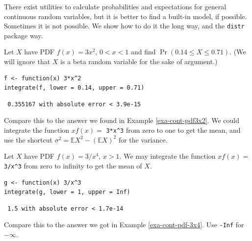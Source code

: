 \documentclass[captions=tableheading]{scrbook}
\begin{document}
There exist utilities to calculate probabilities and expectations for general continuous random variables, but it is better to find a built-in model, if possible. Sometimes it is not possible. We show how to do it the long way, and the \texttt{distr} package way.

\begin{example}
Let \(X\) have PDF \(f(x)=3x^{2}\), \(0<x<1\) and find \(\Pr(0.14\leq X\leq0.71)\). (We will ignore that \(X\) is a beta random variable for the sake of argument.)


\begin{verbatim}
f <- function(x) 3*x^2
integrate(f, lower = 0.14, upper = 0.71)
\end{verbatim}

\begin{verbatim}
 0.355167 with absolute error < 3.9e-15
\end{verbatim}

Compare this to the answer we found in Example \ref{exa-cont-pdf3x2}. We could integrate the function \(xf(x)=\) \texttt{3*x\textasciicircum{}3} from zero to one to get the mean, and use the shortcut \(\sigma^{2}=\mathbb{E} X^{2}-\left(\mathbb{E} X\right)^{2}\) for the variance. 

\end{example}

\begin{example}
Let \(X\) have PDF \(f(x)=3/x^{4}\), \(x>1\). We may integrate the function \(xf(x)=\) \texttt{3/x\textasciicircum{}3} from zero to infinity to get the mean of \(X\).


\begin{verbatim}
g <- function(x) 3/x^3
integrate(g, lower = 1, upper = Inf)
\end{verbatim}

\begin{verbatim}
 1.5 with absolute error < 1.7e-14
\end{verbatim}

Compare this to the answer we got in Example \ref{exa-cont-pdf-3x4}. Use \texttt{-Inf} for \(-\infty\).

\end{example}
\end{document}

